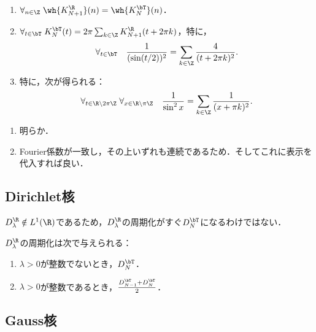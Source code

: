 \documentclass[uplatex,dvipdfmx]{jsreport}
\begin{document}
\begin{proposition}\mbox{}
    \begin{enumerate}
        \item $\forall_{n\in\Z}\;\wh{K^\R_{N+1}}(n)=\wh{K^\bT_N}(n)$．
        \item $\forall_{t\in\bT}\;K_N^\bT(t)=2\pi\sum_{k\in\Z}K^\R_{N+1}(t+2\pi k)$，特に，
        \[\forall_{t\in\bT}\quad \frac{1}{(\sin(t/2))^2}=\sum_{k\in\Z}\frac{4}{(t+2\pi k)^2}.\]
        \item 特に，次が得られる：
        \[\forall_{t\in\R\setminus2\pi\Z}\;\forall_{x\in\R\setminus\pi\Z}\quad\frac{1}{\sin^2x}=\sum_{k\in\Z}\frac{1}{(x+\pi k)^2}.\]
    \end{enumerate}
\end{proposition}
\begin{Proof}\mbox{}
    \begin{enumerate}
        \item 明らか．
        \item Fourier係数が一致し，その上いずれも連続であるため．そしてこれに表示を代入すれば良い．
    \end{enumerate}
\end{Proof}

\subsection{Dirichlet核}

\begin{tcolorbox}[colframe=ForestGreen, colback=ForestGreen!10!white,breakable,colbacktitle=ForestGreen!40!white,coltitle=black,fonttitle=\bfseries\sffamily,
title=]
    $D^\R_\lambda\notin L^1(\R)$であるため，$D^\R_\lambda$の周期化がすぐ$D^\bT_N$になるわけではない．
\end{tcolorbox}

\begin{proposition}
    $D_\lambda^\R$の周期化は次で与えられる：
    \begin{enumerate}
        \item $\lambda>0$が整数でないとき，$D_N^\bT$．
        \item $\lambda>0$が整数であるとき，$\frac{D^\bT_{N-1}+D_N^\bT}{2}$．
    \end{enumerate}
\end{proposition}

\subsection{Gauss核}
\end{document}
